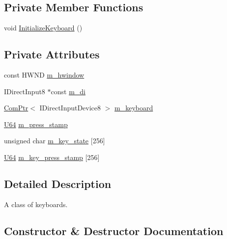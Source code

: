 \subsection*{Private Member Functions}
\begin{DoxyCompactItemize}
\item 
void \hyperlink{classmage_1_1_keyboard_af7aea666e38e5d91ad6bfee2124819a3}{Initialize\+Keyboard} ()
\end{DoxyCompactItemize}
\subsection*{Private Attributes}
\begin{DoxyCompactItemize}
\item 
const H\+W\+ND \hyperlink{classmage_1_1_keyboard_adad9c02695c121898ac578ca25dd5c9a}{m\+\_\+hwindow}
\item 
I\+Direct\+Input8 $\ast$const \hyperlink{classmage_1_1_keyboard_a627eeef05bae81a60c2c44fd039ff7f8}{m\+\_\+di}
\item 
\hyperlink{namespacemage_ae74f374780900893caa5555d1031fd79}{Com\+Ptr}$<$ I\+Direct\+Input\+Device8 $>$ \hyperlink{classmage_1_1_keyboard_a992b8b8caf0d858163e5e9af04302324}{m\+\_\+keyboard}
\item 
\hyperlink{namespacemage_a6672cf3c861707ce4a3235a3eb43941d}{U64} \hyperlink{classmage_1_1_keyboard_a075349dbce5145f46146ccdfea78214a}{m\+\_\+press\+\_\+stamp}
\item 
unsigned char \hyperlink{classmage_1_1_keyboard_a7499df459499f5addd50507ea1e2358c}{m\+\_\+key\+\_\+state} \mbox{[}256\mbox{]}
\item 
\hyperlink{namespacemage_a6672cf3c861707ce4a3235a3eb43941d}{U64} \hyperlink{classmage_1_1_keyboard_a4a9e80f99dfea8ac518fb451965d4047}{m\+\_\+key\+\_\+press\+\_\+stamp} \mbox{[}256\mbox{]}
\end{DoxyCompactItemize}


\subsection{Detailed Description}
A class of keyboards. 

\subsection{Constructor \& Destructor Documentation}
\hypertarget{classmage_1_1_keyboard_ac89c8f4132508901ff2ca57c68709928}{}\label{classmage_1_1_keyboard_ac89c8f4132508901ff2ca57c68709928} 
